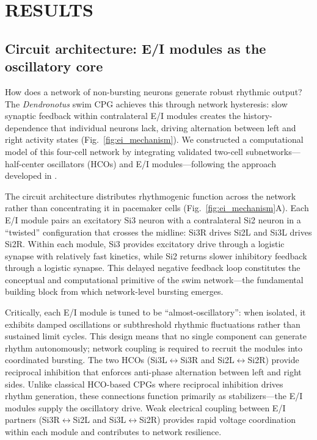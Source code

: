 \section*{RESULTS}

\subsection{Circuit architecture: E/I modules as the oscillatory core}

How does a network of non-bursting neurons generate robust rhythmic output?
The \textit{Dendronotus} swim CPG achieves this through network hysteresis: slow synaptic feedback within contralateral E/I modules creates the history-dependence that individual neurons lack, driving alternation between left and right activity states (Fig.~\ref{fig:ei_mechanism}).
We constructed a computational model of this four-cell network by integrating validated two-cell subnetworks---half-center oscillators (HCOs) and E/I modules---following the approach developed in \cite{scully2024pairing}.

The circuit architecture distributes rhythmogenic function across the network rather than concentrating it in pacemaker cells (Fig.~\ref{fig:ei_mechanism}A).
Each E/I module pairs an excitatory Si3 neuron with a contralateral Si2 neuron in a ``twisted'' configuration that crosses the midline: Si3R drives Si2L and Si3L drives Si2R.
Within each module, Si3 provides excitatory drive through a logistic synapse with relatively fast kinetics, while Si2 returns slower inhibitory feedback through a logistic synapse.
This delayed negative feedback loop constitutes the conceptual and computational primitive of the swim network---the fundamental building block from which network-level bursting emerges.

Critically, each E/I module is tuned to be ``almost-oscillatory'': when isolated, it exhibits damped oscillations or subthreshold rhythmic fluctuations rather than sustained limit cycles.
This design means that no single component can generate rhythm autonomously; network coupling is required to recruit the modules into coordinated bursting.
The two HCOs (Si3L$\leftrightarrow$Si3R and Si2L$\leftrightarrow$Si2R) provide reciprocal inhibition that enforces anti-phase alternation between left and right sides.
Unlike classical HCO-based CPGs where reciprocal inhibition drives rhythm generation, these connections function primarily as stabilizers---the E/I modules supply the oscillatory drive.
Weak electrical coupling between E/I partners (Si3R$\leftrightarrow$Si2L and Si3L$\leftrightarrow$Si2R) provides rapid voltage coordination within each module and contributes to network resilience.

